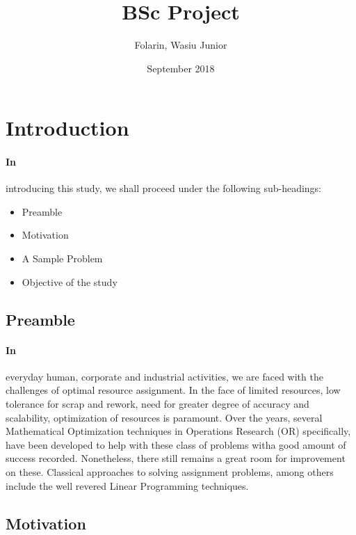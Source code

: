 \documentclass{article}
\title{BSc Project}
\date{September 2018}
\author{Folarin, Wasiu Junior}
\begin{document}
    \normalsize
    \linespread{2.0}
    \newpage
    \section{Introduction}
        \paragraph{In}
        introducing this study, we shall proceed under the following sub-headings:
        \begin{itemize}
            \item Preamble
            \item Motivation
            \item A Sample Problem
            \item Objective of the study
        \end{itemize}
        \subsection{Preamble}
        \paragraph{In}
			everyday human, corporate and industrial activities, we are faced with the challenges of optimal resource assignment. In the face of limited resources, low tolerance for scrap and rework, need for greater degree of accuracy and scalability, optimization of resources is paramount.
            Over the years, several Mathematical Optimization techniques in Operations Research (OR) specifically, have been developed to help with these class of problems witha good amount of success recorded. Nonetheless, there still remains a great room for improvement on these. Classical approaches to solving assignment problems, among others include the well revered Linear Programming techniques.
        \\
		\subsection{Motivation}
\end{document}
